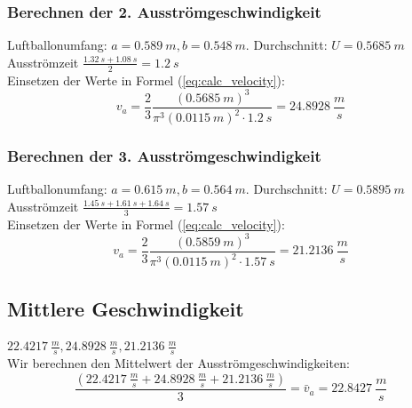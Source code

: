 \documentclass{article}
\begin{document}
    \subsubsection{Berechnen der 2. Ausströmgeschwindigkeit}
        Luftballonumfang: \(a = \SI{0.589}{m}, b = \SI{0.548}{m} \). Durchschnitt: \(U = \SI{0.5685}{m} \) \\
        Ausströmzeit \( \frac{\SI{1.32}{s} + \SI{1.08}{s} }{2} = \SI{1.2}{s} \) \\
        Einsetzen der Werte in Formel (\ref{eq:calc_velocity}):
        \[ v_a = \frac{2}{3} \frac{{( \SI{0.5685}{m} )}^3}{\pi^3 {( \SI{0.0115}{m} )}^2 \cdot \SI{1.2}{s} } = \SI{24.8928}{\frac{m}{s}} \]

    \subsubsection{Berechnen der 3. Ausströmgeschwindigkeit}
        Luftballonumfang: \(a = \SI{0.615}{m}, b = \SI{0.564}{m} \). Durchschnitt: \(U = \SI{0.5895}{m} \) \\
        Ausströmzeit \( \frac{\SI{1.45}{s} + \SI{1.61}{s} + \SI{1.64}{s} }{3} = \SI{1.57}{s} \) \\
        Einsetzen der Werte in Formel (\ref{eq:calc_velocity}):
        \[ v_a = \frac{2}{3} \frac{{( \SI{0.5859}{m} )}^3}{\pi^3 {( \SI{0.0115}{m} )}^2 \cdot \SI{1.57}{s} } = \SI{21.2136}{\frac{m}{s}} \]

    \subsection{Mittlere Geschwindigkeit}
    \( \SI{22.4217}{\frac{m}{s}}, \SI{24.8928}{\frac{m}{s}}, \SI{21.2136}{\frac{m}{s}} \) \\
    Wir berechnen den Mittelwert der Ausströmgeschwindigkeiten:
    \begin{equation} \label{val:mittlere_geschw}
        \frac{ ( \SI{22.4217}{\frac{m}{s}}  + \SI{24.8928}{\frac{m}{s}} + \SI{21.2136}{\frac{m}{s}} ) }{3} = \bar{v}_a = \SI{22.8427}{\frac{m}{s}}
    \end{equation}
\end{document}
